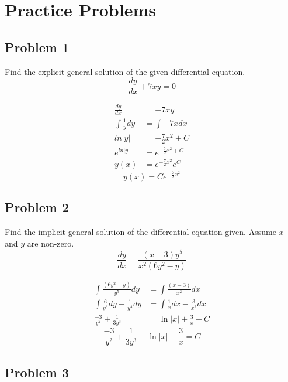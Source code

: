 \documentclass{article}
\begin{document}
\newcommand{\hr}{\par\noindent\rule{\textwidth}{0.4pt}}

\newpage
    \tableofcontents
\newpage

\section{Practice Problems}

\subsection{Problem 1}

Find the explicit general solution of the given differential equation.
$$ \frac{dy}{dx} + 7xy = 0 $$

\begin{align*}
    \frac{dy}{dx} & = -7xy \\
    \int \frac{1}{y}dy & = \int -7xdx \\
    ln|y| & = -\frac{7}{2}x^2 + C \\
    e^{ln|y|} & = e^{-\frac{7}{2}x^2 + C} \\
    y(x) & = e^{-\frac{7}{2}x^2}e^{C}
\end{align*}
\begin{equation*}
    \boxed{y(x) = Ce^{-\frac{7}{2}x^2}}
\end{equation*}

\subsection{Problem 2}

Find the implicit general solution of the differential equation given. Assume $ x $ and $ y $ are non-zero.
$$ \frac{dy}{dx} = \frac{\left( x - 3 \right) y^5}{x^2 \left( 6y^2 - y \right)} $$

\begin{align*}
    \int \frac{\left( 6y^2 - y \right)}{y^5} dy & = \int \frac{\left( x - 3 \right)}{x^2} dx \\
    \int \frac{6}{y^3}dy - \frac{1}{y^4}dy & = \int \frac{1}{x}dx - \frac{3}{x^2}dx \\
    \frac{-3}{y^2} + \frac{1}{3y^3} & = \ln|x| + \frac{3}{x} + C
\end{align*}
\begin{equation*}
    \boxed{\frac{-3}{y^2} + \frac{1}{3y^3} - \ln|x| - \frac{3}{x} = C}
\end{equation*}

\subsection{Problem 3}
\end{document}
